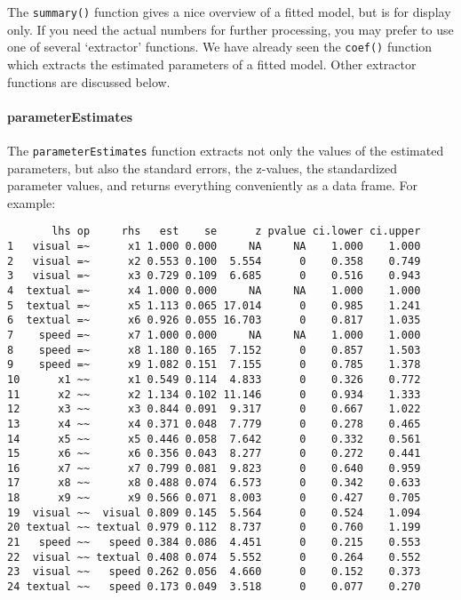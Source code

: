 The \texttt{summary()} function gives a nice overview of a fitted model,
but is for display only. If you need the actual numbers for further
processing, you may prefer to use one of several `extractor' functions.
We have already seen the \texttt{coef()} function which extracts the
estimated parameters of a fitted model. Other extractor functions are
discussed below.

\paragraph{parameterEstimates}

The \texttt{parameterEstimates} function extracts not only the values of
the estimated parameters, but also the standard errors, the z-values,
the standardized parameter values, and returns everything conveniently
as a data frame. For example:

\begin{Shaded}
\begin{Highlighting}[]
\StringTok{ } 
\end{Highlighting}
\end{Shaded}

\begin{verbatim}
       lhs op     rhs   est    se      z pvalue ci.lower ci.upper
1   visual =~      x1 1.000 0.000     NA     NA    1.000    1.000
2   visual =~      x2 0.553 0.100  5.554      0    0.358    0.749
3   visual =~      x3 0.729 0.109  6.685      0    0.516    0.943
4  textual =~      x4 1.000 0.000     NA     NA    1.000    1.000
5  textual =~      x5 1.113 0.065 17.014      0    0.985    1.241
6  textual =~      x6 0.926 0.055 16.703      0    0.817    1.035
7    speed =~      x7 1.000 0.000     NA     NA    1.000    1.000
8    speed =~      x8 1.180 0.165  7.152      0    0.857    1.503
9    speed =~      x9 1.082 0.151  7.155      0    0.785    1.378
10      x1 ~~      x1 0.549 0.114  4.833      0    0.326    0.772
11      x2 ~~      x2 1.134 0.102 11.146      0    0.934    1.333
12      x3 ~~      x3 0.844 0.091  9.317      0    0.667    1.022
13      x4 ~~      x4 0.371 0.048  7.779      0    0.278    0.465
14      x5 ~~      x5 0.446 0.058  7.642      0    0.332    0.561
15      x6 ~~      x6 0.356 0.043  8.277      0    0.272    0.441
16      x7 ~~      x7 0.799 0.081  9.823      0    0.640    0.959
17      x8 ~~      x8 0.488 0.074  6.573      0    0.342    0.633
18      x9 ~~      x9 0.566 0.071  8.003      0    0.427    0.705
19  visual ~~  visual 0.809 0.145  5.564      0    0.524    1.094
20 textual ~~ textual 0.979 0.112  8.737      0    0.760    1.199
21   speed ~~   speed 0.384 0.086  4.451      0    0.215    0.553
22  visual ~~ textual 0.408 0.074  5.552      0    0.264    0.552
23  visual ~~   speed 0.262 0.056  4.660      0    0.152    0.373
24 textual ~~   speed 0.173 0.049  3.518      0    0.077    0.270
\end{verbatim}

